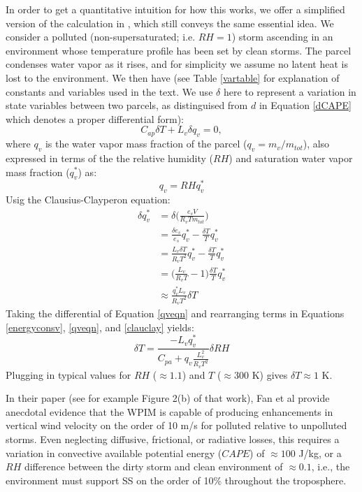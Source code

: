 \documentclass{article}
\begin{document}
In order to get a quantitative intuition for how this works, we offer a simplified version of the calculation in \cite{Grabowski2015}, which still conveys the same essential idea. We consider a polluted (non-supersaturated; i.e. $RH=1$) storm ascending in an environment whose temperature profile has been set by clean storms. The parcel condenses water vapor as it rises, and for simplicity we assume no latent heat is lost to the environment. We then have (see Table \ref{vartable} for explanation of constants and variables used in the text. We use $\delta$ here to represent a variation in state variables between two parcels, as distinguised from $d$ in Equation \ref{dCAPE} which denotes a proper differential form):
\begin{equation}
\label{energyconsv}
C_{ap}\delta T + L_v\delta q_v = 0,
\end{equation}
where $q_v$ is the water vapor mass fraction of the parcel ($q_v=m_v/m_{tot}$), also expressed in terms of the the relative humidity ($RH$) and saturation water vapor mass fraction ($q_v^*$) as:
\begin{equation}
\label{qveqn}
q_v = RHq_v^*
\end{equation}
Usig the Clausius-Clayperon equation:
\begin{align}
\label{clauclay}
\delta q_v^* &= \delta \Big(\frac{e_sV}{R_vTm_{tot}}\Big)\nonumber\\ 
&=\frac{\delta e_s}{e_s}q_v^* - \frac{\delta T}{T}q_v^*\nonumber\\ 
&=\frac{L_v\delta T}{R_vT^2}q_v^* - \frac{\delta T}{T}q_v^*\nonumber\\ 
&=\Big(\frac{L_v}{R_vT} - 1\Big)\frac{\delta T}{T}q_v^*\nonumber\\ 
&\approx \frac{q_v^*L_v}{R_vT^2}\delta T 
\end{align}
Taking the differential of Equation \ref{qveqn} and rearranging terms in Equations \ref{energyconsv}, \ref{qveqn}, and \ref{clauclay} yields:
\begin{equation}
\label{dT}
\delta T = \frac{-L_vq_v^*}{C_{pa} + q_v\frac{L_v^2}{R_vT^2}}\delta RH
\end{equation}
Plugging in typical values for $RH$ ($\approx 1.1$) and $T$ ($\approx 300$ K) gives $\delta T\approx 1$ K.

In their paper (see for example Figure 2(b) of that work), Fan et al provide anecdotal evidence that the WPIM is capable of producing enhancements in vertical wind velocity on the order of 10 m/s for polluted relative to unpolluted storms. Even neglecting diffusive, frictional, or radiative losses, this requires a variation in convective available potential energy ($CAPE$) of $\approx 100$ J/kg, or a $RH$ difference between the dirty storm and clean environment of $\approx 0.1$, i.e., the environment must support SS on the order of 10\% throughout the troposphere.
\end{document}
